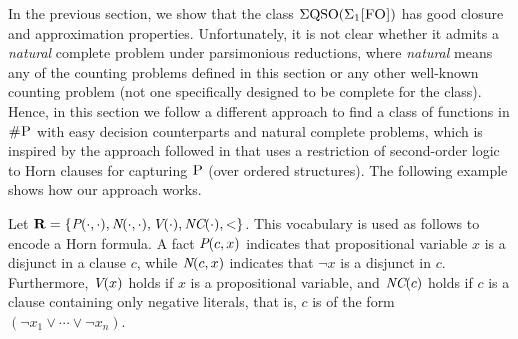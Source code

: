 In the previous section, we show that the class $\Sigma{\rm QSO}(\Sigma_{1}\textsc{[FO]})$ has good closure and approximation properties. Unfortunately, it is not clear whether it admits a {\em natural} complete problem under parsimonious reductions, where {\em natural} means any of the counting problems defined in this section or any other well-known counting problem (not one specifically designed to be complete for the class). Hence, in this section we follow a different approach to find a class of functions in $\text{\sc \#P}$ with easy decision counterparts and natural complete problems, which is inspired by the approach followed in \cite{G92} that uses a restriction of second-order logic to Horn clauses for capturing $\text{\sc P}$ (over ordered structures). The following example shows how our approach works.
\begin{exa} \label{ex-hornsat-esop1}
Let $\mathbf{R} = \{\textit{P}(\cdot,\cdot), \textit{N}(\cdot,\cdot), \textit{V}(\cdot), \textit{NC}(\cdot),<\}$. This vocabulary is used as follows to encode a Horn formula. A fact $\textit{P}(c,x)$ indicates that propositional variable $x$ is a disjunct in a clause $c$, while $\textit{N}(c,x)$ indicates that $\neg x$ is a disjunct in $c$. Furthermore, $\textit{V}(x)$ holds if  $x$ is a propositional variable, and $\textit{NC}(c)$ holds if $c$ is a clause containing only negative literals, that is, $c$ is of the form $(\neg x_1 \vee \cdots \vee \neg x_n)$.


\end{exa}
